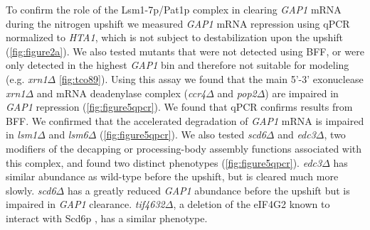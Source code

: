 To confirm the role of the Lsm1-7p/Pat1p  complex in clearing \textit{GAP1}
mRNA during the nitrogen upshift we measured \textit{GAP1} mRNA
repression using qPCR normalized to
\textit{HTA1}, which is not subject to destabilization upon the upshift
(\autoref{fig:figure2a}). We also tested mutants that were not detected using BFF,
or were only detected in the highest \textit{GAP1} bin and therefore
not suitable for modeling
(e.g. \textit{xrn1}$\Delta$ \autoref{fig:tco89}). 
Using this assay we found that the main 5'-3' 
exonuclease \textit{xrn1}$\Delta$ 
and mRNA deadenylase complex (\textit{ccr4}$\Delta$ and
\textit{pop2}$\Delta$) are impaired in \textit{GAP1} repression 
(\autoref{fig:figure5qpcr}).
We found that qPCR confirms results from BFF.
We confirmed that the accelerated degradation of \textit{GAP1} mRNA is impaired
in \textit{lsm1}$\Delta$ and \textit{lsm6}$\Delta$ 
(\autoref{fig:figure5qpcr}). 
We also tested
\textit{scd6}$\Delta$ and \textit{edc3}$\Delta$, two modifiers of the
decapping or processing-body
assembly functions associated with this complex, and found two
distinct phenotypes (\autoref{fig:figure5qpcr}). \textit{edc3}$\Delta$
has similar abundance 
as wild-type before the upshift, but is cleared much more slowly.
\textit{scd6}$\Delta$ has a greatly reduced \textit{GAP1} abundance
before the upshift but is impaired in \textit{GAP1} clearance. 
\textit{tif4632}$\Delta$, a deletion of the eIF4G2
known to interact with Scd6p \parencite{rajyaguru2012scd6}, 
has a similar phenotype. 

